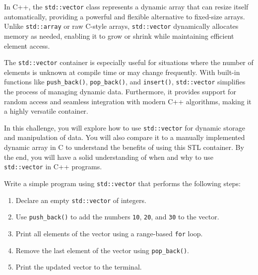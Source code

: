 \begin{challenge}
    \begin{chadescription}
    In C++, the \texttt{std::vector} class represents a dynamic array that can resize itself automatically, providing a powerful and flexible alternative to fixed-size arrays. 
    Unlike \texttt{std::array} or raw C-style arrays, \texttt{std::vector} dynamically allocates memory as needed, enabling it to grow or shrink while maintaining efficient element access.

    The \texttt{std::vector} container is especially useful for situations where the number of elements is unknown at compile time or may change frequently. 
    With built-in functions like \texttt{push_back()}, \texttt{pop_back()}, and \texttt{insert()}, \texttt{std::vector} simplifies the process of managing dynamic data. 
    Furthermore, it provides support for random access and seamless integration with modern C++ algorithms, making it a highly versatile container.

    In this challenge, you will explore how to use \texttt{std::vector} for dynamic storage and manipulation of data. 
    You will also compare it to a manually implemented dynamic array in C to understand the benefits of using this STL container. 
    By the end, you will have a solid understanding of when and why to use \texttt{std::vector} in C++ programs.
    \end{chadescription}

    \begin{task}
        Write a simple program using \texttt{std::vector} that performs the following steps:
        \begin{enumerate}
            \item Declare an empty \texttt{std::vector} of integers.
            \item Use \texttt{push_back()} to add the numbers \texttt{10}, \texttt{20}, and \texttt{30} to the vector.
            \item Print all elements of the vector using a range-based \texttt{for} loop.
            \item Remove the last element of the vector using \texttt{pop_back()}.
            \item Print the updated vector to the terminal.
        \end{enumerate}


\end{task}
\end{challenge}
